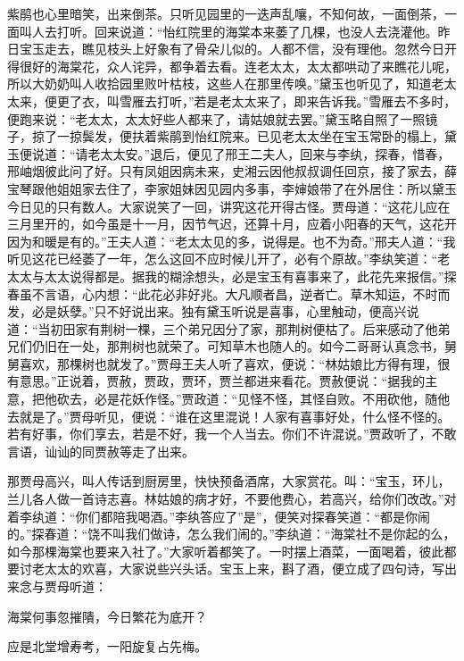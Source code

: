 \begin{parag}
    紫鹃也心里暗笑，出来倒茶。只听见园里的一迭声乱嚷，不知何故，一面倒茶，一面叫人去打听。回来说道：“怡红院里的海棠本来萎了几棵，也没人去浇灌他。昨日宝玉走去，瞧见枝头上好象有了骨朵儿似的。人都不信，没有理他。忽然今日开得很好的海棠花，众人诧异，都争着去看。连老太太，太太都哄动了来瞧花儿呢，所以大奶奶叫人收拾园里败叶枯枝，这些人在那里传唤。”黛玉也听见了，知道老太太来，便更了衣，叫雪雁去打听，”若是老太太来了，即来告诉我。”雪雁去不多时，便跑来说：“老太太，太太好些人都来了，请姑娘就去罢。”黛玉略自照了一照镜子，掠了一掠鬓发，便扶着紫鹃到怡红院来。已见老太太坐在宝玉常卧的榻上，黛玉便说道：“请老太太安。”退后，便见了邢王二夫人，回来与李纨，探春，惜春，邢岫烟彼此问了好。只有凤姐因病未来，史湘云因他叔叔调任回京，接了家去，薛宝琴跟他姐姐家去住了，李家姐妹因见园内多事，李婶娘带了在外居住：所以黛玉今日见的只有数人。大家说笑了一回，讲究这花开得古怪。贾母道：“这花儿应在三月里开的，如今虽是十一月，因节气迟，还算十月，应着小阳春的天气，这花开因为和暖是有的。”王夫人道：“老太太见的多，说得是。也不为奇。”邢夫人道：“我听见这花已经萎了一年，怎么这回不应时候儿开了，必有个原故。”李纨笑道：“老太太与太太说得都是。据我的糊涂想头，必是宝玉有喜事来了，此花先来报信。”探春虽不言语，心内想：“此花必非好兆。大凡顺者昌，逆者亡。草木知运，不时而发，必是妖孽。”只不好说出来。独有黛玉听说是喜事，心里触动，便高兴说道：“当初田家有荆树一棵，三个弟兄因分了家，那荆树便枯了。后来感动了他弟兄们仍旧在一处，那荆树也就荣了。可知草木也随人的。如今二哥哥认真念书，舅舅喜欢，那棵树也就发了。”贾母王夫人听了喜欢，便说：“林姑娘比方得有理，很有意思。”正说着，贾赦，贾政，贾环，贾兰都进来看花。贾赦便说：“据我的主意，把他砍去，必是花妖作怪。”贾政道：“见怪不怪，其怪自败。不用砍他，随他去就是了。”贾母听见，便说：“谁在这里混说！人家有喜事好处，什么怪不怪的。若有好事，你们享去，若是不好，我一个人当去。你们不许混说。”贾政听了，不敢言语，讪讪的同贾赦等走了出来。
\end{parag}


\begin{parag}
    那贾母高兴，叫人传话到厨房里，快快预备酒席，大家赏花。叫：“宝玉，环儿，兰儿各人做一首诗志喜。林姑娘的病才好，不要他费心，若高兴，给你们改改。”对着李纨道：“你们都陪我喝酒。”李纨答应了”是”，便笑对探春笑道：“都是你闹的。”探春道：“饶不叫我们做诗，怎么我们闹的。”李纨道：“海棠社不是你起的么，如今那棵海棠也要来入社了。”大家听着都笑了。一时摆上酒菜，一面喝着，彼此都要讨老太太的欢喜，大家说些兴头话。宝玉上来，斟了酒，便立成了四句诗，写出来念与贾母听道：
\end{parag}


\begin{poem}
    \begin{pl}
        海棠何事忽摧隤，今日繁花为底开？
    \end{pl}


    \begin{pl}
        应是北堂增寿考，一阳旋复占先梅。
    \end{pl}

\end{poem}


